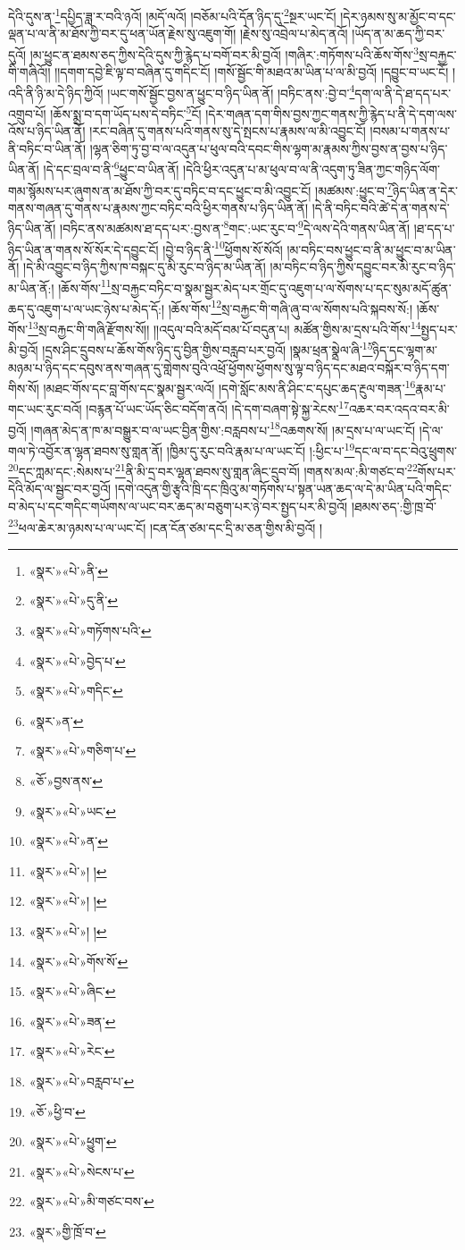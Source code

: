 དེའི་དུས་ན་\footnote{«སྣར་»«པེ་»ནི་}དཔྱིད་ཟླ་ར་བའི་ཉའོ། །མདོ་ལའོ། །བཅོམ་པའི་དོན་ཉིད་དུ་\footnote{«སྣར་»«པེ་»དུ་ནི་}སྔར་ཡང་ངོ། །དེར་ཉམས་སུ་མ་མྱོང་བ་དང་ལྡན་པ་ལ་ནི་མ་ཐོས་ཀྱི་བར་དུ་ཕན་ཡོན་རྗེས་སུ་འཇུག་གོ། །རྗེས་སུ་འབྲེལ་པ་མེད་ནའོ། །ཡོད་ན་མ་ཆད་ཀྱི་བར་དུའོ། །མ་ཕྱུང་ན་ཐམས་ཅད་ཀྱིས་དེའི་དུས་ཀྱི་རྙེད་པ་བགོ་བར་མི་བྱའོ། །གཞིར་:གཏོགས་པའི་ཆོས་གོས་\footnote{«སྣར་»«པེ་»གཏོགས་པའི་}སྲ་བརྐྱང་གི་གཞིའོ།། །།དགག་དབྱེ་ཇི་ལྟ་བ་བཞིན་དུ་གདིང་ངོ། །གསོ་སྦྱོང་གི་མཐའ་མ་ཡིན་པ་ལ་མི་བྱའོ། །དབྱུང་བ་ཡང་ངོ། །འདི་ནི་ཉི་མ་དེ་ཉིད་ཀྱིའོ། །ཡང་གསོ་སྦྱོང་བྱས་ན་ཕྱུང་བ་ཉིད་ཡིན་ནོ། །བཏིང་ནས་:བྱེ་བ་\footnote{«སྣར་»«པེ་»བྱེད་པ་}དག་ལ་ནི་དེ་ཐ་དད་པར་འགྲུབ་པོ། །ཆོས་སྨྲ་བ་དག་ཡོད་པས་དེ་བཏིང་\footnote{«སྣར་»«པེ་»གདིང་}ངོ། །དེར་གཞན་དག་གིས་བྱས་ཀྱང་གནས་ཀྱི་རྙེད་པ་ནི་དེ་དག་ལས་འོས་པ་ཉིད་ཡིན་ནོ། །རང་བཞིན་དུ་གནས་པའི་གནས་སུ་དེ་སྤངས་པ་རྣམས་ལ་མི་འབྱུང་ངོ། །བསམ་པ་གནས་པ་ནི་བཏིང་བ་ཡིན་ནོ། །ལྷན་ཅིག་ཏུ་བྱ་བ་ལ་འདུན་པ་ཕུལ་བའི་དབང་གིས་ལྷག་མ་རྣམས་ཀྱིས་བྱས་ན་བྱས་པ་ཉིད་ཡིན་ནོ། །དེ་དང་བྲལ་བ་ནི་\footnote{«སྣར་»ན་}ཕྱུང་བ་ཡིན་ནོ། །དེའི་ཕྱིར་འདུན་པ་མ་ཕུལ་བ་ལ་ནི་འདུག་ཏུ་ཟིན་ཀྱང་གཉིད་ལོག་གམ་སྙོམས་པར་ཞུགས་ན་མ་ཐོས་ཀྱི་བར་དུ་བཏིང་བ་དང་ཕྱུང་བ་མི་འབྱུང་ངོ། །མཚམས་:ཕྱུང་བ་\footnote{«སྣར་»«པེ་»གཅིག་པ་}ཉིད་ཡིན་ན་དེར་གནས་གཞན་དུ་གནས་པ་རྣམས་ཀྱང་བཏིང་བའི་ཕྱིར་གནས་པ་ཉིད་ཡིན་ནོ། །དེ་ནི་བཏིང་བའི་ཚེ་དེ་ན་གནས་དེ་ཉིད་ཡིན་ནོ། །བཏིང་ནས་མཚམས་ཐ་དད་པར་:བྱས་ན་\footnote{«ཅོ་»བྱས་ནས་}གང་:ཡང་རུང་བ་\footnote{«སྣར་»«པེ་»ཡང་}དེ་ལས་དེའི་གནས་ཡིན་ནོ། །ཐ་དད་པ་ཉིད་ཡིན་ན་གནས་སོ་སོར་དེ་དབྱུང་ངོ། །བྱེ་བ་ཉིད་ནི་\footnote{«སྣར་»«པེ་»ན་}ཕྱོགས་སོ་སོའོ། །མ་བཏིང་བས་ཕྱུང་བ་ནི་མ་ཕྱུང་བ་མ་ཡིན་ནོ། །དེ་མི་འབྱུང་བ་ཉིད་ཀྱིས་ཁ་བསྐང་དུ་མི་རུང་བ་ཉིད་མ་ཡིན་ནོ། །མ་བཏིང་བ་ཉིད་ཀྱིས་དབྱུང་བར་མི་རུང་བ་ཉིད་མ་ཡིན་ནོ:། །ཆོས་གོས་\footnote{«སྣར་»«པེ་»། །}སྲ་བརྐྱང་བཏིང་བ་སྣམ་སྦྱར་མེད་པར་གྲོང་དུ་འཇུག་པ་ལ་སོགས་པ་དང་སུམ་མདོ་ཚུན་ཆད་དུ་འཇུག་པ་ལ་ཡང་ཉེས་པ་མེད་དོ:། །ཆོས་གོས་\footnote{«སྣར་»«པེ་»། །}སྲ་བརྐྱང་གི་གཞི་ཞུ་བ་ལ་སོགས་པའི་སྐབས་སོ:། །ཆོས་གོས་\footnote{«སྣར་»«པེ་»། །}སྲ་བརྐྱང་གི་གཞི་རྫོགས་སོ།། །།འདུལ་བའི་མདོ་བམ་པོ་བདུན་པ། མཚོན་གྱིས་མ་དྲས་པའི་གོས་\footnote{«སྣར་»«པེ་»གོས་སོ་}སྤྱད་པར་མི་བྱའོ། །དྲས་ཤིང་དྲུབས་པ་ཆོས་གོས་ཉིད་དུ་བྱིན་གྱིས་བརླབ་པར་བྱའོ། །སྣམ་ཕྲན་སྣྲེལ་ཞི་\footnote{«སྣར་»«པེ་»ཞིང་}ཉིད་དང་ལྷག་མ་མཉམ་པ་ཉིད་དང་དབུས་ནས་གཞན་དུ་གླེགས་བུའི་འཕྲོ་ཕྱོགས་ཕྱོགས་སུ་ལྟ་བ་ཉིད་དང་མཐའ་བསྐོར་བ་ཉིད་དག་གིས་སོ། །མཐང་གོས་དང་བླ་གོས་དང་སྣམ་སྦྱར་ལའོ། །དགེ་སློང་མས་ནི་ཤིང་ང་དཔུང་ཆད་རྔུལ་གཟན་\footnote{«སྣར་»«པེ་»ཟན་}རྣམ་པ་གང་ཡང་རུང་བའོ། །བརྙན་པོ་ཡང་ཡོད་ཅིང་བདོག་ནའོ། །དེ་དག་བཞག་སྟེ་སྐྱ་རེངས་\footnote{«སྣར་»«པེ་»རེང་}འཆར་བར་འདའ་བར་མི་བྱའོ། །གཞན་མེད་ན་ཁ་མ་བསྒྱུར་བ་ལ་ཡང་བྱིན་གྱིས་:བརླབས་པ་\footnote{«སྣར་»«པེ་»བརླབ་པ་}འཆགས་སོ། །མ་དྲས་པ་ལ་ཡང་ངོ། །དེ་ལ་གལ་ཏེ་འབྱོར་ན་ལྷན་ཐབས་སུ་གླན་ནོ། །ཁྱིམ་དུ་རུང་བའི་རྣམ་པ་ལ་ཡང་ངོ། །:ཕྱིང་པ་\footnote{«ཅོ་»ཕྱི་བ་}དང་ལ་བ་དང་བེའུ་ཕྲུགས་\footnote{«སྣར་»«པེ་»ཕྱུག་}དང་ཀླམ་དང་:སེམས་པ་\footnote{«སྣར་»«པེ་»སེངས་པ་}ནི་མི་དྲ་བར་ལྷན་ཐབས་སུ་གླན་ཞིང་དྲུབ་བོ། །གནས་མལ་:མི་གཙང་བ་\footnote{«སྣར་»«པེ་»མི་གཙང་བས་}གོས་པར་དེའི་མོད་ལ་སྦྱང་བར་བྱའོ། །དགེ་འདུན་གྱི་རྩྭའི་ཁྲི་དང་ཁྲིའུ་མ་གཏོགས་པ་སྟན་ཡན་ཆད་ལ་དེ་མ་ཡིན་པའི་གདིང་བ་མེད་པ་དང་གདིང་གཡོགས་ལ་ཡང་བར་ཆད་མ་བཅུག་པར་ཉེ་བར་སྤྱད་པར་མི་བྱའོ། །ཐམས་ཅད་:གྱི་ཁྲ་བོ་\footnote{«སྣར་»གྱི་ཁྲོ་བ་}ཕལ་ཆེར་མ་ཉམས་པ་ལ་ཡང་ངོ། །ངན་ངོན་ཙམ་དང་དྲི་མ་ཅན་གྱིས་མི་བྱའོ། །
